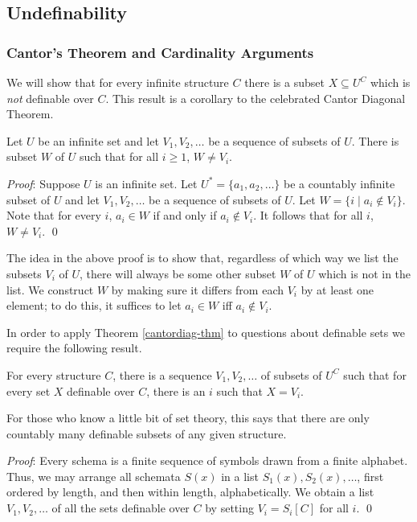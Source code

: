 \subsection{Undefinability}
\subsubsection*{Cantor's Theorem and Cardinality Arguments}
We will show that for every infinite structure $C$ there is a subset $X\subseteq U^C$ which is \emph{not} definable over $C$. This result is a corollary to the celebrated Cantor Diagonal Theorem.
\begin{theorem}[Cantor]\label{cantordiag-thm}
Let $U$ be an infinite set and let $V_1, V_2, \ldots$ be a sequence of subsets of $U$. There is subset $W$ of $U$ such that for all $i\geq 1$, $W\neq V_i$.
\end{theorem}
\emph{Proof}: Suppose $U$ is an infinite set. Let $U^*= \{a_1, a_2, \ldots\}$ be a countably infinite subset of $U$ and let $V_1, V_2, \ldots$ be a sequence of subsets of $U$. Let $W=\{i\mid a_i\not\in V_i\}$. Note that for every $i$, $a_i\in W$ if and only if $a_i\not\in V_i$. It follows that for all $i$, $W\neq V_i$. \qed

\begin{aside}
    The idea in the above proof is to show that, regardless of which way we list the subsets $V_i$ of $U$, there will always be some other subset $W$ of $U$ which is not in the list. We construct $W$ by making sure it differs from each $V_i$ by at least one element; to do this, it suffices to let $a_i \in W$ iff $a_i \not \in V_i$. 
\end{aside}

In order to apply Theorem \ref{cantordiag-thm} to questions about definable sets we require the following result.
\begin{theorem}\label{countschema-thm}
For every structure $C$, there is a sequence $V_1,V_2,\ldots$ of subsets of $U^C$ such that for every set $X$ definable over $C$, there is an $i$ such that $X=V_i$. 

For those who know a little bit of set theory, this says that there are only countably many definable subsets of any given structure.
\end{theorem}
\emph{Proof}: Every schema is a finite sequence of symbols drawn from a finite alphabet. Thus, we may arrange all schemata $S(x)$ in a list $S_1(x), S_2(x),\ldots$, first ordered by length, and then within length, alphabetically. We obtain a list $V_1,V_2,\ldots $ of all the sets definable over $C$ by setting $V_i=S_i[C]$ for all $i$. \qed

